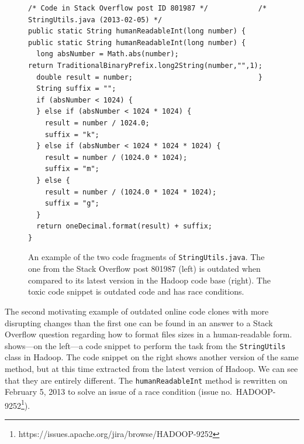 \documentclass[10pt,journal,compsoc]{IEEEtran}
\begin{document}
\begin{figure}
	\begin{lstlisting}
/* Code in Stack Overflow post ID 801987 */            /* StringUtils.java (2013-02-05) */
public static String humanReadableInt(long number) {   public static String humanReadableInt(long number) {
  long absNumber = Math.abs(number);                     return TraditionalBinaryPrefix.long2String(number,"",1);
  double result = number;                              }
  String suffix = "";
  if (absNumber < 1024) {
  } else if (absNumber < 1024 * 1024) {
    result = number / 1024.0;
    suffix = "k";
  } else if (absNumber < 1024 * 1024 * 1024) {
    result = number / (1024.0 * 1024);
    suffix = "m";
  } else {
    result = number / (1024.0 * 1024 * 1024);
    suffix = "g";
  }
  return oneDecimal.format(result) + suffix;
}
	\end{lstlisting}\vspace{-2ex}
	\caption{An example of the two code fragments of
		{\small\texttt{StringUtils.java}}. The one from the
		Stack Overflow post 801987 (left) is outdated when compared to
		its latest version in the \textsf{Hadoop} code base
		(right). The toxic code snippet is outdated code and has race conditions.}
	\label{fig:before-after_2}
\end{figure}

The second motivating example of outdated online code clones with more
disrupting changes than the first one  can be found in an answer to a Stack
Overflow question regarding how to format files sizes in a human-readable form.
 shows---on the left---a code snippet to perform the
task from the {\small{\texttt{StringUtils}}} class in \textsf{Hadoop}. The code snippet on the
right shows another version of the same method, but at this time extracted from
the latest version of \textsf{Hadoop}. We can see that
they are entirely different. The {\small{\texttt{humanReadableInt}}} method is
rewritten on February 5, 2013 to solve an issue of a race condition
(issue no.~HADOOP-9252\footnote{https://issues.apache.org/jira/browse/HADOOP-9252}).
\end{document}
